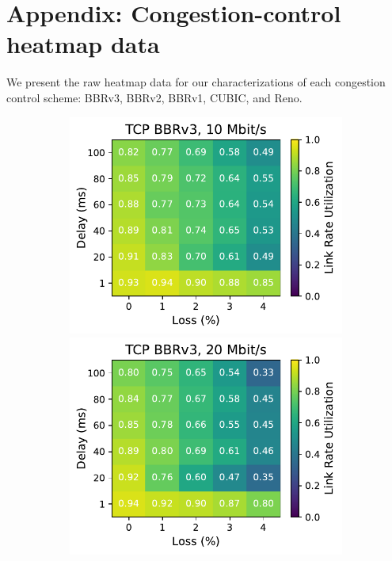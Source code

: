 \section{Appendix: Congestion-control heatmap data}
\label{sec:splitting:appendix}

We present the raw heatmap data for our characterizations of each
congestion control scheme: BBRv3, BBRv2, BBRv1, CUBIC, and Reno.

\begin{figure}[ht]
    \centering
    \begin{subfigure}[b]{0.22\linewidth}
        \includegraphics[width=\linewidth,trim={0 0 2cm 0},clip]{splitting/figures/heatmaps/heatmap_tcp_bbr3_10mbps.pdf}
        \includegraphics[width=\linewidth,trim={0 0 2cm 0},clip]{splitting/figures/heatmaps/heatmap_tcp_bbr3_20mbps.pdf}

\end{subfigure}
\end{figure}
